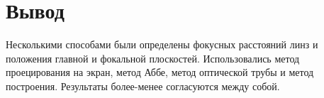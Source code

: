 \section{Вывод}
Несколькими способами были определены фокусных расстояний линз и положения главной и фокальной плоскостей. Использовались метод проецирования на экран, метод Аббе, метод оптической трубы и метод построения. Результаты более-менее согласуются между собой.
